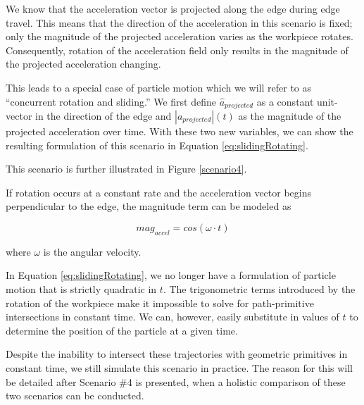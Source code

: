 We know that the acceleration vector is projected along the edge during edge travel. This means that the direction of the acceleration in this scenario is fixed; only the magnitude of the projected acceleration varies as the workpiece rotates. Consequently, rotation of the acceleration field only results in the magnitude of the projected acceleration changing.

This leads to a special case of particle motion which we will refer to as ``concurrent rotation and sliding.'' We first define $\hat{a}_{projected}$ as a constant unit-vector in the direction of the edge and $|a_{projected}|(t)$ as the magnitude of the projected acceleration over time. With these two new variables, we can show the resulting formulation of this scenario in Equation \eqref{eq:slidingRotating}.

 {
	\label{eq:slidingRotating}
}

This scenario is further illustrated in Figure \ref{scenario4}.


If rotation occurs at a constant rate and the acceleration vector begins perpendicular to the edge, the magnitude term can be modeled as

$$
mag_{accel} = cos(\omega \cdot t)
$$

where $\omega$ is the angular velocity.


In Equation \eqref{eq:slidingRotating}, we no longer have a formulation of particle motion that is strictly quadratic in $t$. The trigonometric terms introduced by the rotation of the workpiece make it impossible to solve for path-primitive intersections in constant time. We can, however, easily substitute in values of $t$ to determine the position of the particle at a given time.

Despite the inability to intersect these trajectories with geometric primitives in constant time, we still simulate this scenario in practice. The reason for this will be detailed after Scenario \#4 is presented, when a holistic comparison of these two scenarios can be conducted.


